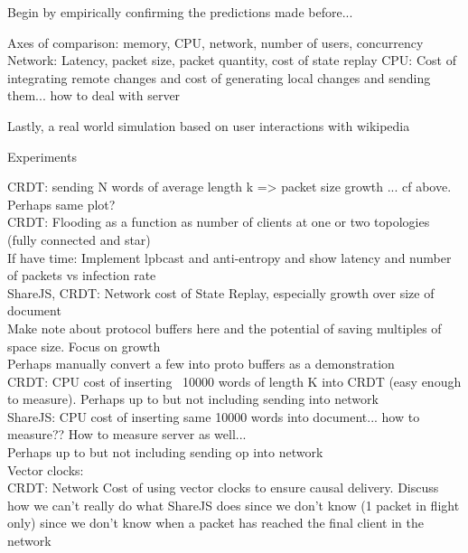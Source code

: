 \documentclass[12pt,a4paper,twoside,openright]{report}
\begin{document}
		
	
			
	
	
	
		Begin by empirically confirming the predictions made before... 
		
		Axes of comparison: memory, CPU, network, number of users, concurrency
			Network: Latency, packet size, packet quantity, cost of state replay
			CPU: Cost of integrating remote changes and cost of generating local changes and sending them... how to deal with server
			
		
		
		Lastly, a real world simulation based on user interactions with wikipedia
		
		
		Experiments

			CRDT:	 sending N words of average length k => packet size growth ... cf above. Perhaps same plot?\\
			CRDT: 	 Flooding as a function as number of clients at one or two topologies (fully connected and star)\\
			
			If have time: Implement lpbcast and anti-entropy and show latency and number of packets vs infection rate\\
			
			ShareJS, CRDT: Network cost of State Replay, especially growth over size of document\\
							Make note about protocol buffers here and the potential of saving multiples of space size. Focus on growth	\\
							Perhaps manually convert a few into proto buffers as a demonstration\\
			
			
			CRDT: 	 CPU cost of inserting ~10000 words of length K into CRDT (easy enough to measure). Perhaps up to but not including sending into network\\
			ShareJS: CPU cost of inserting same 10000 words into document... how to measure?? How to measure server as well...\\
							Perhaps up to but not including sending op into network\\
			
			Vector clocks:\\
				CRDT: Network Cost of using vector clocks to ensure causal delivery. Discuss how we can't really do what ShareJS does since we don't know (1 packet in flight only) since we don't know when a packet has reached the final client in the network
							
\end{document}
